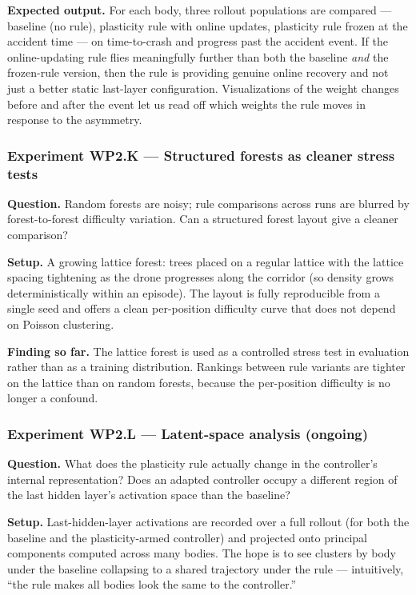 \documentclass[letterpaper,10pt]{article}
\begin{document}
\textbf{Expected output.} For each body, three rollout populations are compared --- baseline (no rule), plasticity rule with online updates, plasticity rule frozen at the accident time --- on time-to-crash and progress past the accident event. If the online-updating rule flies meaningfully further than both the baseline \emph{and} the frozen-rule version, then the rule is providing genuine online recovery and not just a better static last-layer configuration. Visualizations of the weight changes before and after the event let us read off which weights the rule moves in response to the asymmetry.

\subsubsection{Experiment WP2.K --- Structured forests as cleaner stress tests}
\textbf{Question.} Random forests are noisy; rule comparisons across runs are blurred by forest-to-forest difficulty variation. Can a structured forest layout give a cleaner comparison?

\textbf{Setup.} A growing lattice forest: trees placed on a regular lattice with the lattice spacing tightening as the drone progresses along the corridor (so density grows deterministically within an episode). The layout is fully reproducible from a single seed and offers a clean per-position difficulty curve that does not depend on Poisson clustering.

\textbf{Finding so far.} The lattice forest is used as a controlled stress test in evaluation rather than as a training distribution. Rankings between rule variants are tighter on the lattice than on random forests, because the per-position difficulty is no longer a confound.

\subsubsection{Experiment WP2.L --- Latent-space analysis (ongoing)}
\textbf{Question.} What does the plasticity rule actually change in the controller's internal representation? Does an adapted controller occupy a different region of the last hidden layer's activation space than the baseline?

\textbf{Setup.} Last-hidden-layer activations are recorded over a full rollout (for both the baseline and the plasticity-armed controller) and projected onto principal components computed across many bodies. The hope is to see clusters by body under the baseline collapsing to a shared trajectory under the rule --- intuitively, ``the rule makes all bodies look the same to the controller.''
\end{document}
